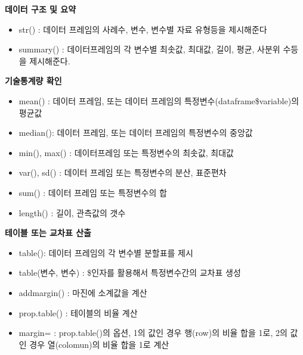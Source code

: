 \documentclass[
]{book}
\providecommand{\tightlist}{%
  \setlength{\itemsep}{0pt}\setlength{\parskip}{0pt}}
\theoremstyle{definition}
\theoremstyle{definition}
\theoremstyle{definition}
\theoremstyle{definition}
\theoremstyle{remark}
\begin{document}
\textbf{데이터 구조 및 요약}

\begin{itemize}
\tightlist
\item
  str() : 데이터 프레임의 사례수, 변수, 변수별 자료 유형등을 제시해준다
\item
  summary() : 데이터프레임의 각 변수별 최솟값, 최대값, 길이, 평균, 사분위 수등을 제시해준다.
\end{itemize}

\textbf{기술통계량 확인}

\begin{itemize}
\tightlist
\item
  mean() : 데이터 프레임, 또는 데이터 프레임의 특정변수(dataframe\$variable)의 평균값
\item
  median(): 데이터 프레임, 또는 데이터 프레임의 특정변수의 중앙값
\item
  min(), max() : 데이터프레임 또는 특정변수의 최솟값, 최대값
\item
  var(), sd() : 데이터 프레임 또는 특정변수의 분산, 표준편차
\item
  sum() : 데이터 프레임 또는 특정변수의 합
\item
  length() : 길이, 관측값의 갯수
\end{itemize}

\textbf{테이블 또는 교차표 산출}

\begin{itemize}
\tightlist
\item
  table(): 데이터 프레임의 각 변수별 분할표를 제시
\item
  table(변수, 변수) : \$인자를 활용해서 특정변수간의 교차표 생성\\
\item
  addmargin() : 마진에 소계값을 계산
\item
  prop.table() : 테이블의 비율 계산
\item
  margin= : prop.table()의 옵션, 1의 값인 경우 행(row)의 비율 합을 1로, 2의 값인 경우 열(colomun)의 비율 합을 1로 계산
\end{itemize}
\end{document}
